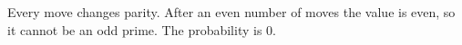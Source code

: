 Every move changes parity. After an even number of moves the value is even, so it cannot be an odd prime. The probability is $\boxed0$.
